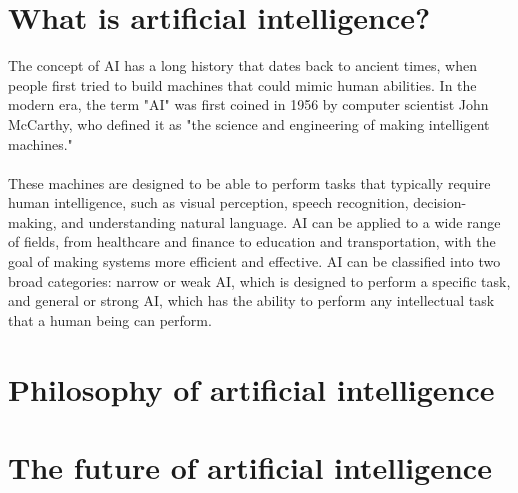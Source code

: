 \section{What is artificial intelligence?}
The concept of AI has a long history that dates back to ancient times, when people first tried to build machines that could mimic human abilities. In the modern era, the term "AI" was first coined in 1956 by computer scientist John McCarthy, who defined it as "the science and engineering of making intelligent machines."
\\
\\
These machines are designed to be able to perform tasks that typically require human intelligence, such as visual perception, speech recognition, decision-making, and understanding natural language. AI can be applied to a wide range of fields, from healthcare and finance to education and transportation, with the goal of making systems more efficient and effective. AI can be classified into two broad categories: narrow or weak AI, which is designed to perform a specific task, and general or strong AI, which has the ability to perform any intellectual task that a human being can perform.

\section{Philosophy of artificial intelligence}

\section{The future of artificial intelligence}

